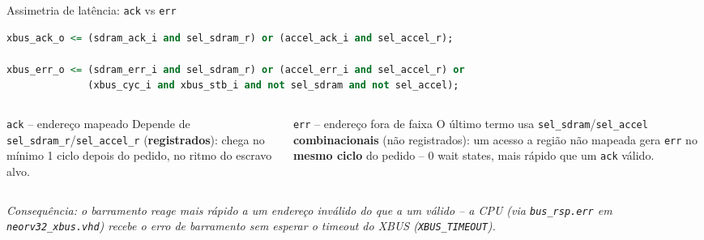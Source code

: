 \documentclass[aspectratio=169,10pt]{beamer}
\begin{document}
\begin{frame}[fragile]{Assimetria de latência: \texttt{ack} vs \texttt{err}}
  \begin{lstlisting}[language=VHDL]
xbus_ack_o <= (sdram_ack_i and sel_sdram_r) or (accel_ack_i and sel_accel_r);

xbus_err_o <= (sdram_err_i and sel_sdram_r) or (accel_err_i and sel_accel_r) or
              (xbus_cyc_i and xbus_stb_i and not sel_sdram and not sel_accel);
  \end{lstlisting}
  \vspace{0.5em}
  \begin{columns}[T]
    \begin{column}{0.5\textwidth}
      \begin{block}{\texttt{ack} -- endereço mapeado}
        Depende de \texttt{sel\_sdram\_r}/\texttt{sel\_accel\_r} (\textbf{registrados}):
        chega no mínimo 1 ciclo depois do pedido, no ritmo do escravo alvo.
      \end{block}
    \end{column}
    \begin{column}{0.5\textwidth}
      \begin{block}{\texttt{err} -- endereço fora de faixa}
        O último termo usa \texttt{sel\_sdram}/\texttt{sel\_accel}
        \textbf{combinacionais} (não registrados): um acesso a região não
        mapeada gera \texttt{err} no \textbf{mesmo ciclo} do pedido -- 0 wait
        states, mais rápido que um \texttt{ack} válido.
      \end{block}
    \end{column}
  \end{columns}
  \vspace{0.5em}
  \small\textit{Consequência: o barramento reage mais rápido a um endereço
  inválido do que a um válido -- a CPU (via \texttt{bus\_rsp.err} em
  \texttt{neorv32\_xbus.vhd}) recebe o erro de barramento sem esperar o
  \emph{timeout} do XBUS (\texttt{XBUS\_TIMEOUT}).}
\end{frame}
\end{document}
